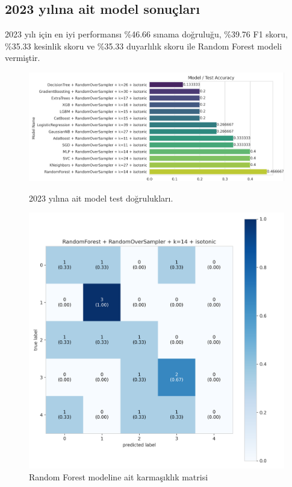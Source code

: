 \newpage

\subsection{2023 yılına ait model sonuçları}
2023 yılı için en iyi performansı \%46.66 sınama doğruluğu,  \%39.76 F1 skoru, \%35.33 kesinlik skoru ve \%35.33 duyarlılık skoru ile Random Forest modeli vermiştir.

\begin{figure}[ht]
\centering
\begin{minipage}[b]{0.6\textwidth}
    \centering
    \includegraphics[width=\textwidth]{2023.png}
    \caption{2023 yılına ait model test doğrulukları.}
    \label{fig:resim1}
\end{minipage}
\hfill
\begin{minipage}[b]{0.6\textwidth}
    \centering
    \includegraphics[width=\textwidth]{2023_cm.png}
    \caption{Random Forest modeline ait karmaşıklık matrisi}
    \label{fig:resim2}
\end{minipage}
\end{figure}

